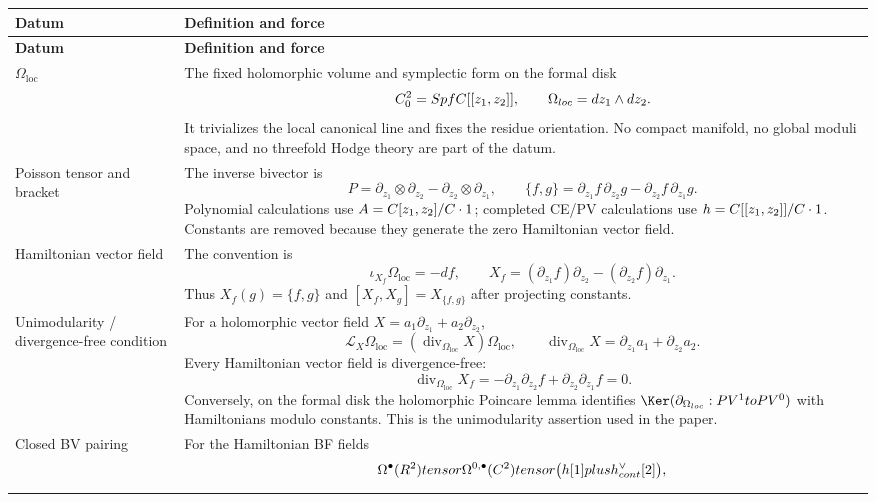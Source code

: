 \begin{longtable}{@{}>{\raggedright\arraybackslash}p{}
  >{\raggedright\arraybackslash}p{}@{}}
\hline
\textbf{Datum} & \textbf{Definition and force}\\
\hline
\endfirsthead
\hline
\textbf{Datum} & \textbf{Definition and force}\\
\hline
\endhead
\(\Omega_{\mathrm{loc}}\) &
The fixed holomorphic volume and symplectic form on the formal disk
\[
  C^2_0=SpfC[[z_1,z_2]],
  \qquad
  \Omega_{loc}=dz_1\wedge dz_2 .
\]
It trivializes the local canonical line and fixes the residue
orientation.  No compact manifold, no global moduli space, and no
threefold Hodge theory are part of the datum.\\
\hline
Poisson tensor and bracket &
The inverse bivector is
\[
  P=\partial_{z_1}\otimes\partial_{z_2}
    -\partial_{z_2}\otimes\partial_{z_1},
  \qquad
  \{f,g\}=\partial_{z_1}f\,\partial_{z_2}g
    -\partial_{z_2}f\,\partial_{z_1}g .
\]
Polynomial calculations use \(A=C[z_1,z_2]/C\cdot1\); completed
CE/PV calculations use
\(h=C[[z_1,z_2]]/C\cdot1\).  Constants are removed because
they generate the zero Hamiltonian vector field.\\
\hline
Hamiltonian vector field &
The convention is
\[
  \iota_{X_f}\Omega_{\mathrm{loc}}=-df,\qquad
  X_f=(\partial_{z_1}f)\partial_{z_2}
      -(\partial_{z_2}f)\partial_{z_1}.
\]
Thus \(X_f(g)=\{f,g\}\) and
\([X_f,X_g]=X_{\{f,g\}}\) after projecting constants.\\
\hline
Unimodularity / divergence-free condition &
For a holomorphic vector field
\(X=a_1\partial_{z_1}+a_2\partial_{z_2}\),
\[
  \mathcal L_X\Omega_{\mathrm{loc}}
    =(\operatorname{div}_{\Omega_{\mathrm{loc}}}X)\Omega_{\mathrm{loc}},
  \qquad
  \operatorname{div}_{\Omega_{\mathrm{loc}}}X
    =\partial_{z_1}a_1+\partial_{z_2}a_2 .
\]
Every Hamiltonian vector field is divergence-free:
\[
  \operatorname{div}_{\Omega_{\mathrm{loc}}}X_f
  =-\partial_{z_1}\partial_{z_2}f
    +\partial_{z_2}\partial_{z_1}f=0 .
\]
Conversely, on the formal disk the holomorphic Poincare lemma identifies
\(\Ker(\partial_{\Omega_{\mathrm{loc}}}\colon\mathrm{PV}^1\to
\mathrm{PV}^0)\) with Hamiltonians modulo constants.  This is the
unimodularity assertion used in the paper.\\
\hline
Closed BV pairing &
For the Hamiltonian BF fields
\[
  \Omega^\bullet(R^2)tensor\Omega^{0,\bullet}(C^2)
  tensor
  \bigl(h[1]plus
  h^\vee_{cont}[2]\bigr),
\]
\end{longtable}
